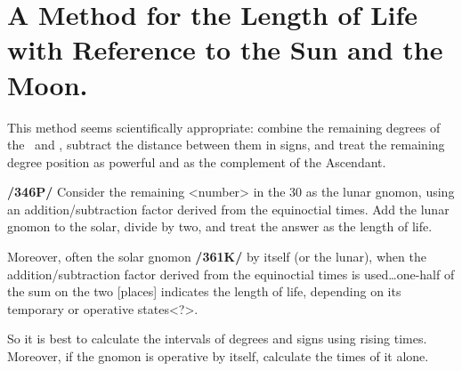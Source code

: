 \section{A Method for the Length of Life with Reference to the Sun and the Moon.}
This method seems scientifically appropriate: combine the remaining degrees of the \Sun\, and \Moon, subtract the distance between them in signs, and treat the remaining degree position as powerful and as the
complement of the Ascendant. 

\textbf{/346P/} Consider the remaining <number> in the 30 as the lunar gnomon, using an addition/subtraction factor derived from the equinoctial times. Add the lunar gnomon to the solar, divide by two, and treat the answer as the length of life. 

Moreover, often the solar gnomon \textbf{/361K/} by itself (or the lunar), when the addition/subtraction factor derived from the equinoctial times is used…one-half of the sum on the two [places] indicates the length of life, depending on its temporary or operative states<?>.

So it is best to calculate the intervals of degrees and signs using rising times. Moreover, if the gnomon is operative by itself, calculate the times of it alone.

\newpage